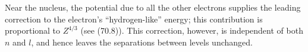 Near the nucleus, the potential due to all the other electrons supplies the leading correction to the electron's ``hydrogen-like'' energy; this contribution is proportional to $Z^{4/3}$ (see (70.8)). This correction, however, is independent of both $n$ and $l$, and hence leaves the separations between levels unchanged.
